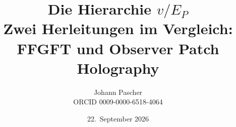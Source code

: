 \documentclass[11pt,a4paper]{report}
\title{Die Hierarchie $v/E_P$\\[0.5em]\large Zwei Herleitungen im Vergleich: FFGFT und Observer Patch Holography}
\date{22.~September 2026}
\author{Johann Pascher\\\small ORCID 0009-0000-6518-4064}
\begin{document}
\renewcommand{\thechapter}{}
\renewcommand{\thesection}{\arabic{section}}
\maketitle
\tableofcontents

\end{document}
